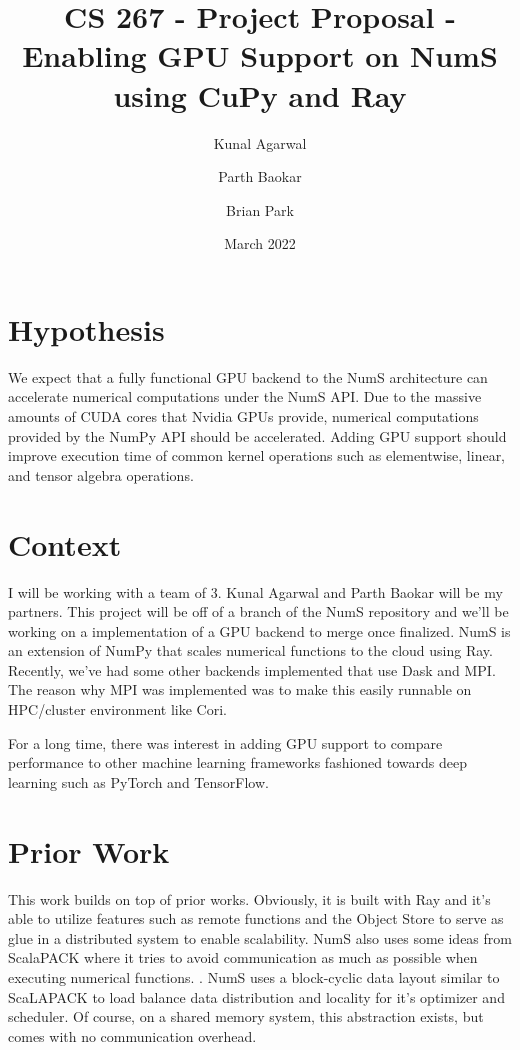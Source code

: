 \documentclass{article}
\title{CS 267 - Project Proposal - Enabling GPU Support on NumS using CuPy and Ray}
\author{Kunal Agarwal}
\author{Parth Baokar}
\author{Brian Park}
\affil{UC Berkeley, Computer Science 267}
\date{March 2022}
\begin{document}
\maketitle


\section{Hypothesis}
We expect that a fully functional GPU backend to the NumS architecture can accelerate numerical computations under the NumS API. Due to the massive amounts of CUDA cores that Nvidia GPUs provide, numerical computations provided by the NumPy API should be accelerated. Adding GPU support should improve execution time of common kernel operations such as elementwise, linear, and tensor algebra operations.

\section{Context}
I will be working with a team of 3. Kunal Agarwal and Parth Baokar will be my partners. This project will be off of a branch of the NumS repository and we'll be working on a implementation of a GPU backend to merge once finalized. \cite{NumS} NumS is an extension of NumPy that scales numerical functions to the cloud using Ray. Recently, we've had some other backends implemented that use Dask and MPI. The reason why MPI was implemented was to make this easily runnable on HPC/cluster environment like Cori.

For a long time, there was interest in adding GPU support to compare performance to other machine learning frameworks fashioned towards deep learning such as PyTorch and TensorFlow.

\section{Prior Work}
This work builds on top of prior works. Obviously, it is built with Ray and it's able to utilize features such as remote functions and the Object Store to serve as glue in a distributed system to enable scalability. \cite{DBLP:journals/corr/abs-1712-05889} NumS also uses some ideas from ScalaPACK where it tries to avoid communication as much as possible when executing numerical functions. \cite{10.5555/265932}.  NumS uses a block-cyclic data layout similar to ScaLAPACK to load balance data distribution and locality for it's optimizer and scheduler. Of course, on a shared memory system, this abstraction exists, but comes with no communication overhead.
\end{document}
